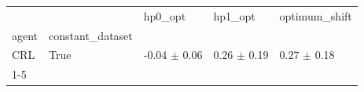 \begin{tabular}{lllll}
\toprule
 &  & hp0_opt & hp1_opt & optimum_shift \\
agent & constant_dataset &  &  &  \\
\midrule
CRL & True & -0.04 $\pm$ 0.06 & 0.26 $\pm$ 0.19 & 0.27 $\pm$ 0.18 \\
\cline{1-5}
\bottomrule
\end{tabular}

